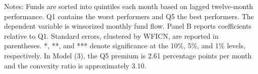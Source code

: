 \documentclass{article}
\begin{document}
\begin{table}[htbp]
\begin{threeparttable}
\begin{tablenotes}
\footnotesize
\item Notes: Funds are sorted into quintiles each month based on lagged twelve-month performance. Q1 contains the worst performers and Q5 the best performers. The dependent variable is winsorized monthly fund flow. Panel B reports coefficients relative to Q1. Standard errors, clustered by WFICN, are reported in parentheses. *, **, and *** denote significance at the 10\%, 5\%, and 1\% levels, respectively. In Model (3), the Q5 premium is 2.61 percentage points per month and the convexity ratio is approximately 3.10.
\end{tablenotes}

\end{threeparttable}
\end{table}

\end{document}
